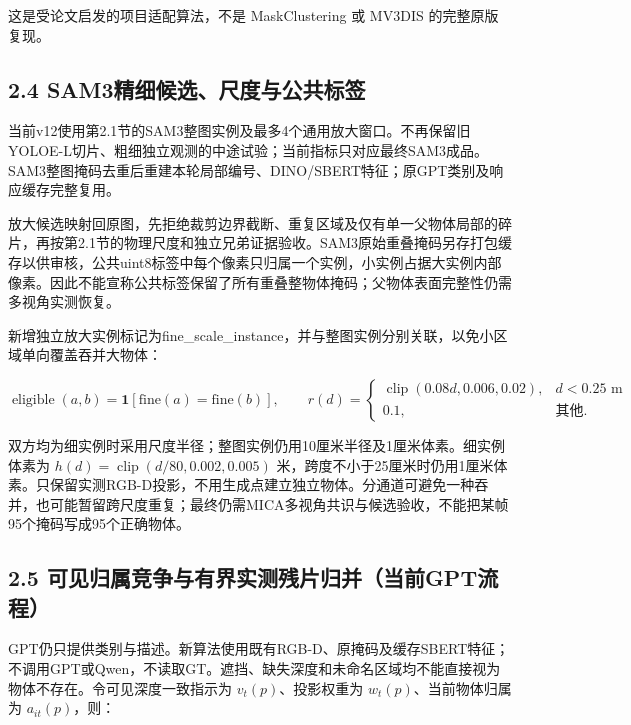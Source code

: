 \documentclass[UTF8,fontset=fandol]{ctexart}
\begin{document}
这是受论文启发的项目适配算法，不是 MaskClustering 或 MV3DIS 的完整原版复现。



\subsection*{2.4 SAM3精细候选、尺度与公共标签}

当前v12使用第2.1节的SAM3整图实例及最多4个通用放大窗口。不再保留旧YOLOE-L切片、粗细独立观测的中途试验；当前指标只对应最终SAM3成品。SAM3整图掩码去重后重建本轮局部编号、DINO/SBERT特征；原GPT类别及响应缓存完整复用。



放大候选映射回原图，先拒绝裁剪边界截断、重复区域及仅有单一父物体局部的碎片，再按第2.1节的物理尺度和独立兄弟证据验收。SAM3原始重叠掩码另存打包缓存以供审核，公共uint8标签中每个像素只归属一个实例，小实例占据大实例内部像素。因此不能宣称公共标签保留了所有重叠整物体掩码；父物体表面完整性仍需多视角实测恢复。



新增独立放大实例标记为fine\_scale\_instance，并与整图实例分别关联，以免小区域单向覆盖吞并大物体：



\[
\operatorname{eligible}(a,b)=\mathbf1[\mathrm{fine}(a)=\mathrm{fine}(b)],\qquad
r(d)=\begin{cases}\operatorname{clip}(0.08d,0.006,0.02),&d<0.25\text{ m}\\0.1,&\text{其他}.\end{cases}
\]

双方均为细实例时采用尺度半径；整图实例仍用10厘米半径及1厘米体素。细实例体素为 $h(d)=\operatorname{clip}(d/80,0.002,0.005)$ 米，跨度不小于25厘米时仍用1厘米体素。只保留实测RGB-D投影，不用生成点建立独立物体。分通道可避免一种吞并，也可能暂留跨尺度重复；最终仍需MICA多视角共识与候选验收，不能把某帧95个掩码写成95个正确物体。



\subsection*{2.5 可见归属竞争与有界实测残片归并（当前GPT流程）}

GPT仍只提供类别与描述。新算法使用既有RGB-D、原掩码及缓存SBERT特征；不调用GPT或Qwen，不读取GT。遮挡、缺失深度和未命名区域均不能直接视为物体不存在。令可见深度一致指示为 $v_t(p)$、投影权重为 $w_t(p)$、当前物体归属为 $a_{it}(p)$，则：
\end{document}
